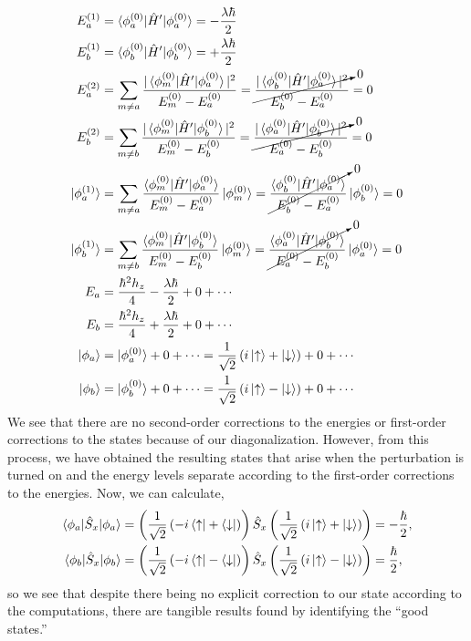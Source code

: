 \documentclass[10pt]{article}
\newcommand{\1}{\mathbf 1}
\begin{document}
\begin{align}
	E_a^{(1)}
	&=
	\braket{\phi_{a}^{(0)} | \hat H' | \phi_{a}^{(0)}}
	=
	-\frac{\lambda\hbar}{2}
	\\
	E_b^{(1)}
	&=
	\braket{\phi_{b}^{(0)} | \hat H' | \phi_{b}^{(0)}}
	=
	+\frac{\lambda\hbar}{2}
	\\
	E_a^{(2)}
	&=
	\sum_{m \ne a}
	\frac{|\braket{\phi_{m}^{(0)} | \hat H' | \phi_{a}^{(0)}}|^2}{E_{m}^{(0)}-E_{a}^{(0)}}
	=
	\cancelto{0}{\frac{|\braket{\phi_{b}^{(0)} | \hat H' | \phi_{a}^{(0)}}|^2}{E_{b}^{(0)}-E_{a}^{(0)}}}
	=
	0
	\\
	E_b^{(2)}
	&=
	\sum_{m \ne b}
	\frac{|\braket{\phi_{m}^{(0)} | \hat H' | \phi_{b}^{(0)}}|^2}{E_{m}^{(0)}-E_{b}^{(0)}}
	=
	\cancelto{0}{\frac{|\braket{\phi_{a}^{(0)} | \hat H' | \phi_{b}^{(0)}}|^2}{E_{a}^{(0)}-E_{b}^{(0)}}}
	=
	0
	\\
	\ket{\phi^{(1)}_a}
	&=
	\sum_{m \ne a}
	\frac{\braket{\phi_{m}^{(0)} | \hat H' | \phi_{a}^{(0)}}}{E_{m}^{(0)}-E_{a}^{(0)}}
	\ket{\phi_m^{(0)}}
	=
	\cancelto{0}{\frac{\braket{\phi_{b}^{(0)} | \hat H' | \phi_{a}^{(0)}}}{E_{b}^{(0)}-E_{a}^{(0)}}} 
	\ket{\phi_b^{(0)}}
	=
	0
	\\
	\ket{\phi^{(1)}_b}
	&=
	\sum_{m \ne b}
	\frac{\braket{\phi_{m}^{(0)} | \hat H' | \phi_{b}^{(0)}}}{E_{m}^{(0)}-E_{b}^{(0)}}
	\ket{\phi_m^{(0)}}
	=
	\cancelto{0}{\frac{\braket{\phi_{a}^{(0)} | \hat H' | \phi_{b}^{(0)}}}{E_{a}^{(0)}-E_{b}^{(0)}}}
	\ket{\phi_a^{(0)}}
	=
	0
	\\
	E_a
	&=
	\frac{\hbar^2h_z}{4}
	-\frac{\lambda\hbar}{2}
	+
	0
	+
	\cdots
	\\
	E_b
	&=
	\frac{\hbar^2h_z}{4}
	+\frac{\lambda\hbar}{2}
	+
	0
	+
	\cdots
	\\
	\ket{\phi_a}
	&=
	\ket{\phi_a^{(0)}}
	+
	0
	+
	\cdots
	=
	\frac{1}{\sqrt{2}} \left(i\ket{\uparrow} +  \ket{\downarrow}\right)
	+
	0
	+
	\cdots
	\\
	\ket{\phi_b}
	&=
	\ket{\phi_b^{(0)}}
	+
	0
	+
	\cdots
	=
	\frac{1}{\sqrt{2}} \left(i\ket{\uparrow} -  \ket{\downarrow}\right)
	+
	0
	+
	\cdots
\end{align}
We see that there are no second-order corrections to the energies or first-order corrections to the states because of our diagonalization. 
However, from this process, we have obtained the resulting states that arise when the perturbation is turned on and the energy levels separate according to the first-order corrections to the energies.
Now, we can calculate,
\begin{align}
	\braket{\phi_a | \hat S_x |\phi_a}
	&=
	\left(\frac{1}{\sqrt{2}} \left(-i\bra{\uparrow} +  \bra{\downarrow}\right)\right)
	\hat S_x
	\left(
		\frac{1}{\sqrt{2}} \left(i\ket{\uparrow} +  \ket{\downarrow}\right)
	\right)
	=
	-
	\frac{\hbar}{2},
	\\
	\braket{\phi_b | \hat S_x |\phi_b}
	&=
	\left(\frac{1}{\sqrt{2}} \left(-i\bra{\uparrow} -  \bra{\downarrow}\right)\right)
	\hat S_x
	\left(
		\frac{1}{\sqrt{2}} \left(i\ket{\uparrow} -  \ket{\downarrow}\right)
	\right)
	=
	\frac{\hbar}{2},
\end{align}
so we see that despite there being no explicit correction to our state according to the computations, there are tangible results found by identifying the ``good states.''
\end{document}
